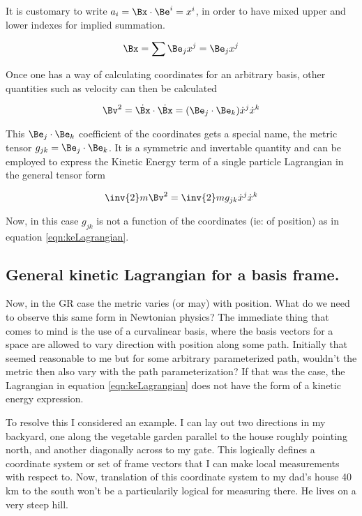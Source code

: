 \documentclass{article}      %
\newcommand{\xdot}[0]{\dot{x}}
\begin{document}
It is customary to write $a_i = \Bx \cdot \Be^i = x^i$, in order to have
mixed upper and lower indexes for implied summation.

\begin{equation*}
\Bx = \sum \Be_j x^j = \Be_j x^j
\end{equation*}

Once one has a way of calculating coordinates for an arbitrary basis, other quantities such as velocity
can then be calculated

\begin{equation*}
\Bv^2 = \dot{\Bx} \cdot \dot{\Bx} = (\Be_j \cdot \Be_k) \xdot^j \xdot^k
\end{equation*}

This
$\Be_j \cdot \Be_k$ coefficient of the coordinates
gets a special name, the metric tensor
$g_{j k} = \Be_j \cdot \Be_k$.  It is a symmetric and invertable quantity and can be employed to 
express the Kinetic Energy term of a single particle Lagrangian in the general tensor form 

\begin{equation*}
\inv{2} m \Bv^2 = \inv{2} m g_{j k} \xdot^j \xdot^k
\end{equation*}

Now, in this case $g_{j k}$ is not a function of the coordinates (ie: of position) as in
equation \ref{eqn:keLagrangian}.

\subsection{ General kinetic Lagrangian for a basis frame. }

Now, in the GR case the metric varies (or may) with position.  What do we need to observe this same form in Newtonian
physics?  The immediate thing that comes to mind is the use of a curvalinear basis, where the basis vectors
for a space are allowed to vary direction with position along some path.  Initially that seemed reasonable to
me but for some arbitrary parameterized path, wouldn't the metric then also vary with the path parameterization?  If that
was the case, the Lagrangian in equation \ref{eqn:keLagrangian} does not have the form of a kinetic energy expression.

To resolve this I considered an example.  I can lay out two directions in my backyard, one along the vegetable garden
parallel to the house roughly pointing north, and another diagonally across to my gate.  This logically defines a coordinate
system or set of frame vectors that I can make local measurements with respect to.
Now, translation of this coordinate system
to my dad's house 40 km to the south won't be a particularily logical for measuring there.  He lives on a very 
steep hill.
\end{document}

